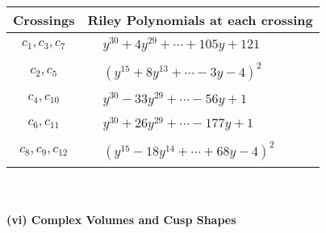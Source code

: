 \documentclass[1p]{elsarticle_modified}
\theoremstyle{definition}
\begin{document}
\begin{tabular}{m{50pt}|m{274pt}}
Crossings & \hspace{64pt}Riley Polynomials at each crossing \\
\hline $$\begin{aligned}c_{1},c_{3},c_{7}\end{aligned}$$&$\begin{aligned}
&y^{30}+4 y^{29}+\cdots+105 y+121
\end{aligned}$\\
\hline $$\begin{aligned}c_{2},c_{5}\end{aligned}$$&$\begin{aligned}
&(y^{15}+8 y^{13}+\cdots-3 y-4)^{2}
\end{aligned}$\\
\hline $$\begin{aligned}c_{4},c_{10}\end{aligned}$$&$\begin{aligned}
&y^{30}-33 y^{29}+\cdots-56 y+1
\end{aligned}$\\
\hline $$\begin{aligned}c_{6},c_{11}\end{aligned}$$&$\begin{aligned}
&y^{30}+26 y^{29}+\cdots-177 y+1
\end{aligned}$\\
\hline $$\begin{aligned}c_{8},c_{9},c_{12}\end{aligned}$$&$\begin{aligned}
&(y^{15}-18 y^{14}+\cdots+68 y-4)^{2}
\end{aligned}$\\
\hline
\end{tabular}\\~\\
\newpage\flushleft \textbf{(vi) Complex Volumes and Cusp Shapes}
\end{document}
